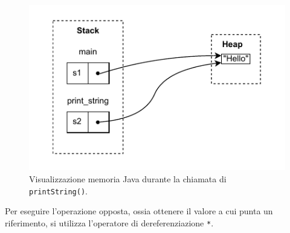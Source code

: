 \begin{figure}[H]
    \centering
    \includegraphics[scale = 1]{Figures/bor2.drawio.pdf}
    \caption{Visualizzazione memoria Java durante la chiamata di \texttt{printString()}.}
    \label{fig:bor2}
\end{figure} 
Per eseguire l'operazione opposta, ossia ottenere il valore a cui punta un riferimento, si utilizza l'operatore di dereferenziazione \texttt{*}. 

